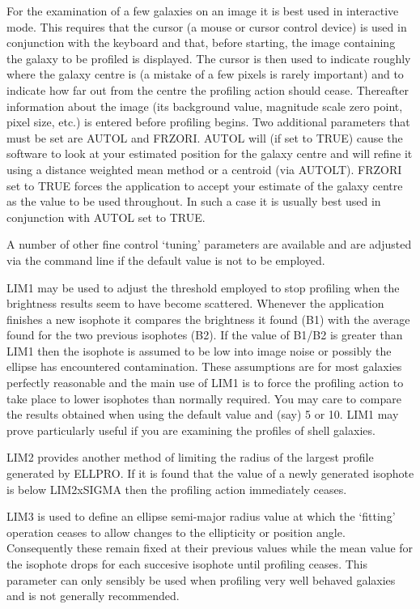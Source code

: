 \documentclass[twoside,11pt]{article}
\begin{document}
For the examination of a few galaxies on an image it is best used in 
interactive mode. This requires that the cursor (a mouse or cursor 
control device) is used in conjunction with the keyboard and that, 
before starting, the image containing the galaxy to be profiled is 
displayed. The cursor is then used to indicate roughly where the
galaxy centre is (a mistake of a few pixels is rarely important) 
and to indicate how far out from the centre the profiling action 
should cease. Thereafter information about the image (its background 
value, magnitude scale zero point, pixel size, etc.) is entered 
before profiling begins. Two additional parameters that must be set 
are AUTOL and FRZORI. AUTOL will (if set to TRUE) cause the software 
to look at your estimated position for the galaxy centre and will 
refine it using a distance weighted mean method or a centroid (via AUTOLT). 
FRZORI set to TRUE forces the application to accept your estimate of 
the galaxy centre as the value to be used throughout. In such a case it 
is usually best used in conjunction with AUTOL set to TRUE.

A number of other fine control `tuning' parameters are available 
and are adjusted via the command line if the default value 
is not to be employed.

LIM1 may be used to adjust the threshold employed to stop profiling when 
the brightness results seem to have become scattered. Whenever the 
application finishes a new isophote it compares the brightness it 
found (B1) with the average found for the two previous isophotes (B2). 
If the value of  B1/B2 is greater than LIM1 then the isophote is 
assumed to be low into image noise or possibly the ellipse has 
encountered contamination. These assumptions are for most galaxies 
perfectly reasonable and the main use of LIM1 is to force the profiling 
action to take place to lower isophotes than normally required. You 
may care to compare the results obtained when using the default value and 
(say) 5 or 10. LIM1 may prove particularly useful if you are examining 
the profiles of shell galaxies.

LIM2 provides another method of limiting the radius of the largest profile 
generated by ELLPRO. If it is found that the value of a newly 
generated isophote is below LIM2xSIGMA then the profiling action immediately 
ceases. 

LIM3 is used to define an ellipse semi-major radius value at which 
the `fitting' operation ceases to allow changes to the ellipticity or 
position angle. Consequently these remain fixed at their previous values 
while the mean value for the isophote drops for each succesive 
isophote until profiling ceases. This parameter can only sensibly be used 
when profiling very well behaved galaxies and is not generally recommended.
\end{document}
